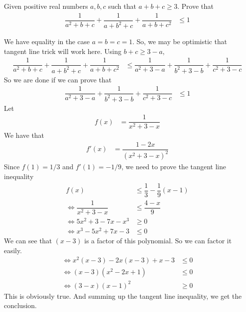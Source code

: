\documentclass[inequalities.tex]{subfile}
\begin{document}
		\begin{problem}
			Given positive real numbers $a,b,c$ such that $a+b+c\geq 3$. Prove that
				\begin{align*}
					\dfrac{1}{a^{2}+b+c}+\dfrac{1}{a+b^{2}+c}+\dfrac{1}{a+b+c^{2}}
						& \leq 1
				\end{align*}
			
				\begin{solution}
					We have equality in the case $a=b=c=1$. So, we may be optimistic that tangent line trick will work here. Using $b+c\geq 3-a$,
						\begin{align*}
							\dfrac{1}{a^{2}+b+c}+\dfrac{1}{a+b^{2}+c}+\dfrac{1}{a+b+c^{2}}
								& \leq \dfrac{1}{a^{2}+3-a}+\dfrac{1}{b^{2}+3-b}+\dfrac{1}{c^{2}+3-c}
						\end{align*}
					So we are done if we can prove that
						\begin{align*}
							\dfrac{1}{a^{2}+3-a}+\dfrac{1}{b^{2}+3-b}+\dfrac{1}{c^{2}+3-c}
								& \leq 1
						\end{align*}
					Let
						\begin{align*}
							f(x)
								& = \dfrac{1}{x^{2}+3-x}
						\end{align*}
					We have that
						\begin{align*}
							f'(x)
								& = \dfrac{1-2x}{(x^{2}+3-x)^{2}}
						\end{align*}
					Since $f(1)=1/3$ and $f'(1)=-1/9$, we need to prove the tangent line inequality
						\begin{align*}
							f(x)
								& \leq \dfrac{1}{3}-\dfrac{1}{9}(x-1)\\
							\iff \dfrac{1}{x^{2}+3-x}
								& \leq \dfrac{4-x}{9}\\
							\iff 5x^{2}+3-7x-x^{3}
								& \geq 0\\
							\iff x^{3}-5x^{2}+7x-3
								& \leq 0
						\end{align*}
					We can see that $(x-3)$ is a factor of this polynomial. So we can factor it easily.
						\begin{align*}
							\iff x^{2}(x-3)-2x(x-3)+x-3
								& \leq 0\\
							\iff (x-3)(x^{2}-2x+1)
								& \leq 0\\
							\iff (3-x)(x-1)^{2}
								& \geq 0
						\end{align*}
					This is obviously true. And summing up the tangent line inequality, we get the conclusion.
				\end{solution}
		\end{problem}
	
\end{document}
